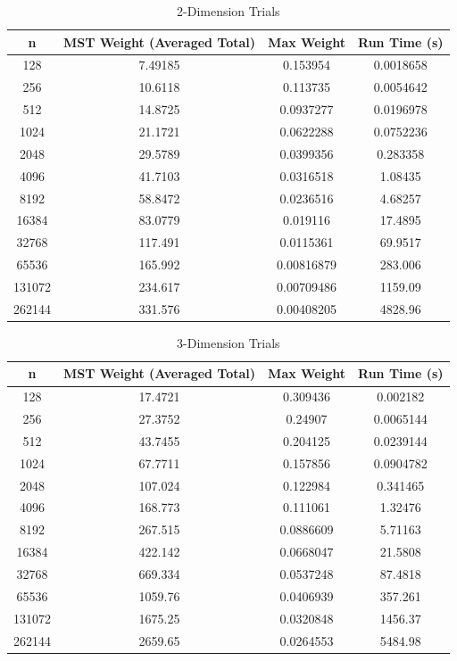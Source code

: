 \documentclass[conference]{styles/acmsiggraph}
\newcommand{\?}{\stackrel{?}{=}}
\begin{document}
\begin{table}[htbp]
  \centering
  \caption{2-Dimension Trials}
    \begin{tabular}{cccc}
    \toprule
    \textbf{n} & \textbf{MST Weight (Averaged Total)} & \textbf{Max Weight} & \textbf{Run Time (s)} \\
    \midrule
    128   & 7.49185 & 0.153954 & 0.0018658 \\
    256   & 10.6118 & 0.113735 & 0.0054642 \\
    512   & 14.8725 & 0.0937277 & 0.0196978 \\
    1024  & 21.1721 & 0.0622288 & 0.0752236 \\
    2048  & 29.5789 & 0.0399356 & 0.283358 \\
    4096  & 41.7103 & 0.0316518 & 1.08435 \\
    8192  & 58.8472 & 0.0236516 & 4.68257 \\
    16384 & 83.0779 & 0.019116 & 17.4895 \\
    32768 & 117.491 & 0.0115361 & 69.9517 \\
    65536 & 165.992 & 0.00816879 & 283.006 \\
    131072 & 234.617 & 0.00709486 & 1159.09 \\
    262144 & 331.576 & 0.00408205 & 4828.96 \\
    \bottomrule
    \end{tabular}%
  \label{tab:addlabel}%
\end{table}%


\begin{table}[htbp]
  \centering
  \caption{3-Dimension Trials}
    \begin{tabular}{cccc}
    \toprule
    \textbf{n} & \textbf{MST Weight (Averaged Total)} & \textbf{Max Weight} & \textbf{Run Time (s)} \\
    \midrule
    128   & 17.4721 & 0.309436 & 0.002182 \\
    256   & 27.3752 & 0.24907 & 0.0065144 \\
    512   & 43.7455 & 0.204125 & 0.0239144 \\
    1024  & 67.7711 & 0.157856 & 0.0904782 \\
    2048  & 107.024 & 0.122984 & 0.341465 \\
    4096  & 168.773 & 0.111061 & 1.32476 \\
    8192  & 267.515 & 0.0886609 & 5.71163 \\
    16384 & 422.142 & 0.0668047 & 21.5808 \\
    32768 & 669.334 & 0.0537248 & 87.4818 \\
    65536 & 1059.76 & 0.0406939 & 357.261 \\
    131072 & 1675.25 & 0.0320848 & 1456.37 \\
    262144 & 2659.65 & 0.0264553 & 5484.98 \\
    \bottomrule
    \end{tabular}%
  \label{tab:addlabel}%
\end{table}%
\end{document}
